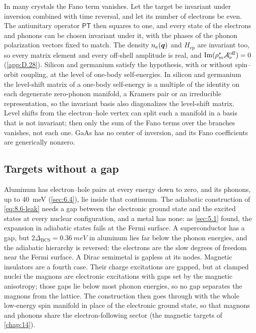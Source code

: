 In many crystals the Fano term vanishes. Let the target be invariant under inversion combined with time reversal, and let its number of electrons be even. The antiunitary operator $\mathsf{P}\mathsf{T}$ then squares to one, and every state of the electrons and phonons can be chosen invariant under it, with the phases of the phonon polarization vectors fixed to match. The density $n_e(\bm{q})$ and $H_{\mathrm{ep}}$ are invariant too, so every matrix element and every off-shell amplitude is real, and $\operatorname{Im}(\rho_m^*\mathcal{A}^{\mathrm{off}}_\nu) = 0$ (\cref{app:D.28}). Silicon and germanium satisfy the hypothesis, with or without spin--orbit coupling, at the level of one-body self-energies. In silicon and germanium the level-shift matrix of a one-body self-energy is a multiple of the identity on each degenerate zero-phonon manifold, a Kramers pair or an irreducible representation, so the invariant basis also diagonalizes the level-shift matrix. Level shifts from the electron--hole vertex can split such a manifold in a basis that is not invariant; then only the sum of the Fano terms over the branches vanishes, not each one. GaAs has no center of inversion, and its Fano coefficients are generically nonzero.

\subsection{Targets without a gap}

Aluminum has electron--hole pairs at every energy down to zero, and its phonons, up to \SI{40}{meV} (\cref{sec:6.4}), lie inside that continuum. The adiabatic construction of \cref{eq:8.6-leak} needs a gap between the electronic ground state and the excited states at every nuclear configuration, and a metal has none: as \cref{sec:5.1} found, the expansion in adiabatic states fails at the Fermi surface. A superconductor has a gap, but $2\Delta_{\mathrm{BCS}} = \SI{0.36}{meV}$ in aluminum lies far below the phonon energies, and the adiabatic hierarchy is reversed: the electrons are the slow degrees of freedom near the Fermi surface. A Dirac semimetal is gapless at its nodes. Magnetic insulators are a fourth case. Their charge excitations are gapped, but at clamped nuclei the magnons are electronic excitations with gaps set by the magnetic anisotropy; those gaps lie below most phonon energies, so no gap separates the magnons from the lattice. The construction then goes through with the whole low-energy spin manifold in place of the electronic ground state, so that magnons and phonons share the electron-following sector (the magnetic targets of \cref{chap:14}).

